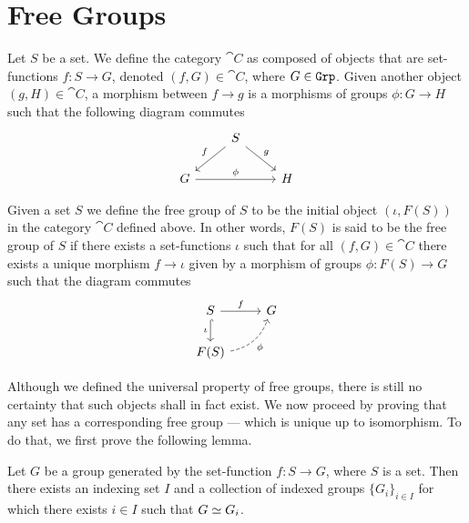 \section{Free Groups}

Let \(S\) be a set. We define the category \(\cat C\) as composed of objects
that are set-functions \(f: S \to G\), denoted \((f, G) \in \cat C\), where \(G
\in {\texttt{Grp}}\). Given another object \((g, H) \in \cat C\), a morphism between \(f
\to g\) is a morphisms of groups \(\phi: G \to H\) such that the following
diagram commutes
\[
    \begin{tikzcd}
        &S \ar[dr, "g"] \ar[dl, swap, "f"] & \\
        G \ar[rr, "\phi"] & &H
    \end{tikzcd}
\]

\begin{proposition}
    \label{prop:free-group-universal-property}
    Given a set \(S\) we define the free group of \(S\) to be the initial object
    \((\iota, F(S))\) in the category \(\cat C\) defined above. In other words,
    \(F(S)\) is said to be the free group of \(S\) if there exists a set-functions
    \(\iota\) such that for all \((f, G) \in \cat C\) there exists a unique morphism
    \(f \to \iota\) given by a morphism of groups \(\phi: F(S) \to G\) such that the
    diagram commutes
    \[
        \begin{tikzcd}
            S \ar[d, swap, hook, "\iota"] \ar[r, "f"] & G \\
            F(S) \ar[ur, dashed, bend right, swap, "\phi"] &
        \end{tikzcd}
    \]
\end{proposition}

Although we defined the universal property of free groups, there is still no
certainty that such objects shall in fact exist. We now proceed by proving that
any set has a corresponding free group --- which is unique up to isomorphism. To
do that, we first prove the following lemma.

\begin{lemma}\label{lem:isomorphism-indexing-set-group}
    Let \(G\) be a group generated by the set-function \(f: S \to G\), where
    \(S\) is a set. Then there exists an indexing set \(I\) and a collection of
    indexed groups \(\{G_i\}_{i \in I}\) for which there exists \(i \in I\) such
    that \(G \simeq G_i\).
\end{lemma}

